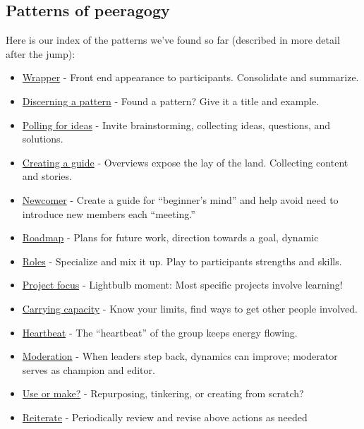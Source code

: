 \subsection{Patterns of peeragogy}

Here is our index of the patterns we've found so far (described in more
detail after the jump):

\begin{itemize}
\item
  \href{http://peeragogy.org/patterns/wrapper/}{Wrapper} - Front end
  appearance to participants. Consolidate and summarize.
\item
  \href{http://peeragogy.org/patterns/discerning-a-pattern/}{Discerning
  a pattern} - Found a pattern? Give it a title and example.
\item
  \href{http://peeragogy.org/patterns/polling-for-ideas/}{Polling for
  ideas} - Invite brainstorming, collecting ideas, questions, and
  solutions.
\item
  \href{http://peeragogy.org/patterns/creating-a-guide/}{Creating a
  guide} - Overviews expose the lay of the land. Collecting content and
  stories.
\item
  \href{http://peeragogy.org/patterns/newcomer/}{Newcomer} - Create a
  guide for ``beginner's mind'' and help avoid need to introduce new
  members each ``meeting.''
\item
  \href{http://peeragogy.org/patterns/roadmap/}{Roadmap} - Plans for
  future work, direction towards a goal, dynamic
\item
  \href{http://peeragogy.org/patterns/roles/}{Roles} - Specialize and
  mix it up. Play to participants strengths and skills.
\item
  \href{http://peeragogy.org/focusing-on-a-specific-project/}{Project
  focus} - Lightbulb moment: Most specific projects involve learning!
\item
  \href{http://peeragogy.org/patterns/carrying-capacity/}{Carrying
  capacity} - Know your limits, find ways to get other people involved.
\item
  \href{http://peeragogy.org/patterns/heartbeat/}{Heartbeat} - The
  ``heartbeat'' of the group keeps energy flowing.
\item
  \href{http://peeragogy.org/patterns/moderation/}{Moderation} - When
  leaders step back, dynamics can improve; moderator serves as champion
  and editor.
\item
  \href{http://peeragogy.org/patterns/praxis-vs-poeisis/}{Use or make?}
  - Repurposing, tinkering, or creating from scratch?
\item
  \href{http://peeragogy.org/reiterate/}{Reiterate} - Periodically
  review and revise above actions as needed
\end{itemize}
